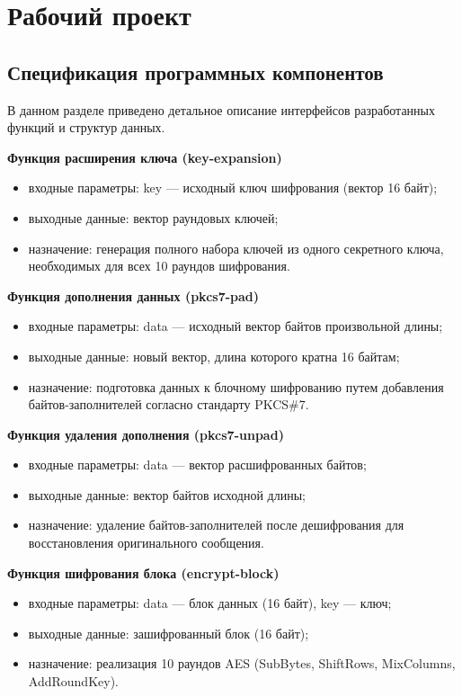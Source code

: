 \section{Рабочий проект}

\subsection{Спецификация программных компонентов}

В данном разделе приведено детальное описание интерфейсов разработанных функций и структур данных.

\textbf{Функция расширения ключа (key-expansion)}
\begin{itemize}
	\item входные параметры: key — исходный ключ шифрования (вектор 16 байт);
	\item выходные данные: вектор раундовых ключей;
	\item назначение: генерация полного набора ключей из одного секретного ключа, необходимых для всех 10 раундов шифрования.
\end{itemize}

\textbf{Функция дополнения данных (pkcs7-pad)}
\begin{itemize}
	\item входные параметры: data — исходный вектор байтов произвольной длины;
	\item выходные данные: новый вектор, длина которого кратна 16 байтам;
	\item назначение: подготовка данных к блочному шифрованию путем добавления байтов-заполнителей согласно стандарту PKCS\#7.
\end{itemize}

\textbf{Функция удаления дополнения (pkcs7-unpad)}
\begin{itemize}
	\item входные параметры: data — вектор расшифрованных байтов;
	\item выходные данные: вектор байтов исходной длины;
	\item назначение: удаление байтов-заполнителей после дешифрования для восстановления оригинального сообщения.
\end{itemize}

\textbf{Функция шифрования блока (encrypt-block)}
\begin{itemize}
	\item входные параметры: data — блок данных (16 байт), key — ключ;
	\item выходные данные: зашифрованный блок (16 байт);
	\item назначение: реализация 10 раундов AES (SubBytes, ShiftRows, MixColumns, AddRoundKey).
\end{itemize}

